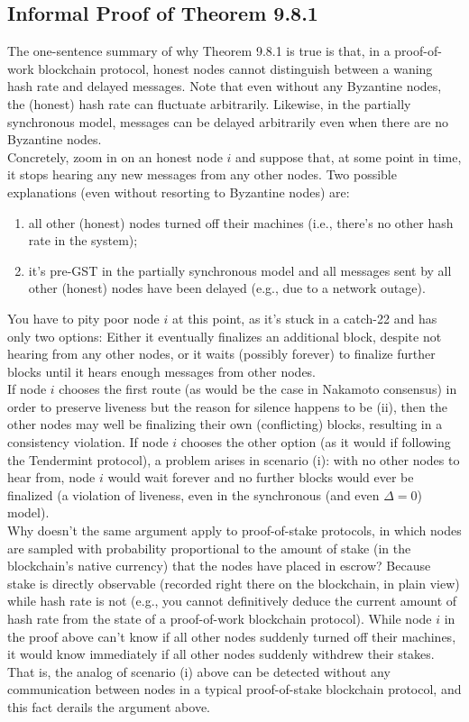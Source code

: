 \subsection{Informal Proof of Theorem 9.8.1}
The one-sentence summary of why Theorem 9.8.1 is true is that, in a proof-of-work blockchain
protocol, honest nodes cannot distinguish between a waning hash rate and delayed messages.
Note that even without any Byzantine nodes, the (honest) hash rate can fluctuate arbitrarily.
Likewise, in the partially synchronous model, messages can be delayed arbitrarily even when
there are no Byzantine nodes.\\

Concretely, zoom in on an honest node $i$ and suppose that, at some point in time, it stops
hearing any new messages from any other nodes. Two possible explanations (even without
resorting to Byzantine nodes) are:\\
\begin{enumerate}[label=(\roman*)]
    \item all other (honest) nodes turned off their machines (i.e., there’s no other hash rate in
the system);
    \item it’s pre-GST in the partially synchronous model and all messages sent by all other
(honest) nodes have been delayed (e.g., due to a network outage).
\end{enumerate}

You have to pity poor node $i$ at this point, as it’s stuck in a catch-22 and has only two options:
Either it eventually finalizes an additional block, despite not hearing from any other nodes,
or it waits (possibly forever) to finalize further blocks until it hears enough messages from
other nodes.\\

If node $i$ chooses the first route (as would be the case in Nakamoto consensus) in order
to preserve liveness but the reason for silence happens to be (ii), then the other nodes
may well be finalizing their own (conflicting) blocks, resulting in a consistency violation. If
node $i$ chooses the other option (as it would if following the Tendermint protocol), a problem
arises in scenario (i): with no other nodes to hear from, node $i$ would wait forever and no
further blocks would ever be finalized (a violation of liveness, even in the synchronous (and
even $\Delta = 0$) model).\\

Why doesn't the same argument apply to proof-of-stake protocols, in which nodes are
sampled with probability proportional to the amount of stake (in the blockchain’s native currency) that the nodes have placed in escrow? Because stake is directly observable (recorded right there on the blockchain, in plain view) while hash rate is not (e.g., you cannot definitively deduce the current amount of hash rate from the state of a proof-of-work blockchain protocol). While node $i$ in the proof above can’t know if all other nodes suddenly turned
off their machines, it would know immediately if all other nodes suddenly withdrew their
stakes. That is, the analog of scenario (i) above can be detected without any communication between nodes in a typical proof-of-stake blockchain protocol, and this fact derails the argument above.

